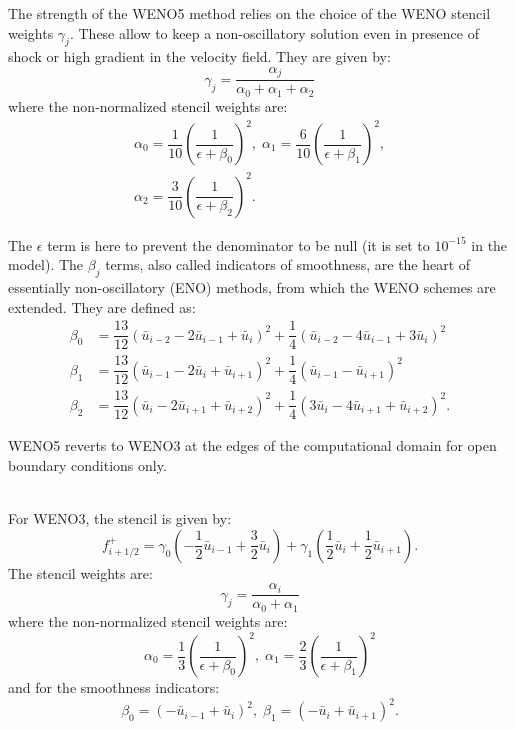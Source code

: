 The strength of the WENO5 method relies on the choice of the WENO stencil weights $\gamma_j$. These allow to keep a non-oscillatory solution even in presence of shock or high gradient in the velocity field. They are given by:
\begin{equation}
 \gamma_j = \dfrac{\alpha_j}{\alpha_0+\alpha_1+\alpha_2}
\end{equation}
where the non-normalized stencil weights are:
\begin{equation}
\begin{split}
 \alpha_0 = \dfrac{1}{10} \left( \dfrac{1}{\epsilon + \beta_0} \right) ^2 , \;
 \alpha_1 = \dfrac{6}{10} \left( \dfrac{1}{\epsilon + \beta_1} \right) ^2 , \\
 \alpha_2 = \dfrac{3}{10} \left( \dfrac{1}{\epsilon + \beta_2} \right) ^2.
\end{split} 
\end{equation}

The $\epsilon$ term is here to prevent the denominator to be null (it is set to $10^{-15}$ in the model). The $\beta_j$ terms, also called indicators of smoothness, are the heart of essentially non-oscillatory (ENO) methods, from which the WENO schemes are extended. They are defined as:
\begin{align}
 \beta_0 &= \dfrac{13}{12} \left( \bar{u}_{i-2} - 2\bar{u}_{i-1} + \bar{u}_{i} \right)^2 + \dfrac{1}{4} \left( \bar{u}_{i-2} - 4\bar{u}_{i-1} + 3\bar{u}_{i} \right)^2 \nonumber \\
 \beta_1 &= \dfrac{13}{12} \left( \bar{u}_{i-1} - 2\bar{u}_{i} + \bar{u}_{i+1} \right)^2 + \dfrac{1}{4} \left( \bar{u}_{i-1} - \bar{u}_{i+1} \right)^2 \\
 \beta_2 &= \dfrac{13}{12} \left( \bar{u}_{i} - 2\bar{u}_{i+1} + \bar{u}_{i+2} \right)^2 + \dfrac{1}{4} \left( 3\bar{u}_{i} - 4\bar{u}_{i+1} + \bar{u}_{i+2} \right)^2. \nonumber
\end{align}

WENO5 reverts to WENO3 at the edges of the computational domain for open boundary conditions only.

~\\
For WENO3, the stencil is given by:
\begin{equation}
 f^+_{i+1/2} = \gamma_0 \left(-\dfrac{1}{2} \bar{u}_{i-1} + \dfrac{3}{2} \bar{u}_{i} \right) +
	         \gamma_1 \left(\dfrac{1}{2} \bar{u}_{i} + \dfrac{1}{2} \bar{u}_{i+1} \right).     
\end{equation}
The stencil weights are:
\begin{equation}
 \gamma_j = \dfrac{\alpha_i}{\alpha_0+\alpha_1}
\end{equation}
where the non-normalized stencil weights are:
\begin{equation}
 \alpha_0 = \dfrac{1}{3} \left( \dfrac{1}{\epsilon + \beta_0} \right) ^2 , \;
 \alpha_1 = \dfrac{2}{3} \left( \dfrac{1}{\epsilon + \beta_1} \right) ^2 
\end{equation}
and for the smoothness indicators:
\begin{equation}
 \beta_0 = \left(-\bar{u}_{i-1} + \bar{u}_{i} \right)^2  , \;
 \beta_1 = \left(-\bar{u}_{i} + \bar{u}_{i+1} \right)^2.
\end{equation}

